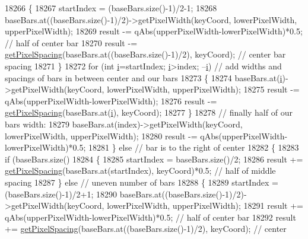 \begin{DoxyCode}
18266       \{
18267         startIndex = (baseBars.size()-1)/2-1;
18268         baseBars.at((baseBars.size()-1)/2)->getPixelWidth(keyCoord, lowerPixelWidth, upperPixelWidth);
18269         result -= qAbs(upperPixelWidth-lowerPixelWidth)*0.5; \textcolor{comment}{// half of center bar}
18270         result -= \hyperlink{class_q_c_p_bars_group_a0beccd41bc3841a4c5b284823bc7d2de}{getPixelSpacing}(baseBars.at((baseBars.size()-1)/2), keyCoord); \textcolor{comment}{// center
       bar spacing}
18271       \}
18272       \textcolor{keywordflow}{for} (\textcolor{keywordtype}{int} \hyperlink{_comparision_pictures_2_createtest_image_8m_a6f6ccfcf58b31cb6412107d9d5281426}{i}=startIndex; \hyperlink{_comparision_pictures_2_createtest_image_8m_a6f6ccfcf58b31cb6412107d9d5281426}{i}>index; --\hyperlink{_comparision_pictures_2_createtest_image_8m_a6f6ccfcf58b31cb6412107d9d5281426}{i}) \textcolor{comment}{// add widths and spacings of bars in between center and our
       bars}
18273       \{
18274         baseBars.at(\hyperlink{_comparision_pictures_2_createtest_image_8m_a6f6ccfcf58b31cb6412107d9d5281426}{i})->getPixelWidth(keyCoord, lowerPixelWidth, upperPixelWidth);
18275         result -= qAbs(upperPixelWidth-lowerPixelWidth);
18276         result -= \hyperlink{class_q_c_p_bars_group_a0beccd41bc3841a4c5b284823bc7d2de}{getPixelSpacing}(baseBars.at(\hyperlink{_comparision_pictures_2_createtest_image_8m_a6f6ccfcf58b31cb6412107d9d5281426}{i}), keyCoord);
18277       \}
18278       \textcolor{comment}{// finally half of our bars width:}
18279       baseBars.at(index)->getPixelWidth(keyCoord, lowerPixelWidth, upperPixelWidth);
18280       result -= qAbs(upperPixelWidth-lowerPixelWidth)*0.5;
18281     \} \textcolor{keywordflow}{else} \textcolor{comment}{// bar is to the right of center}
18282     \{
18283       \textcolor{keywordflow}{if} (baseBars.size() %
18284       \{
18285         startIndex = baseBars.size()/2;
18286         result += \hyperlink{class_q_c_p_bars_group_a0beccd41bc3841a4c5b284823bc7d2de}{getPixelSpacing}(baseBars.at(startIndex), keyCoord)*0.5; \textcolor{comment}{// half of middle
       spacing}
18287       \} \textcolor{keywordflow}{else} \textcolor{comment}{// uneven number of bars}
18288       \{
18289         startIndex = (baseBars.size()-1)/2+1;
18290         baseBars.at((baseBars.size()-1)/2)->getPixelWidth(keyCoord, lowerPixelWidth, upperPixelWidth);
18291         result += qAbs(upperPixelWidth-lowerPixelWidth)*0.5; \textcolor{comment}{// half of center bar}
18292         result += \hyperlink{class_q_c_p_bars_group_a0beccd41bc3841a4c5b284823bc7d2de}{getPixelSpacing}(baseBars.at((baseBars.size()-1)/2), keyCoord); \textcolor{comment}{// center
}
\end{DoxyCode}
